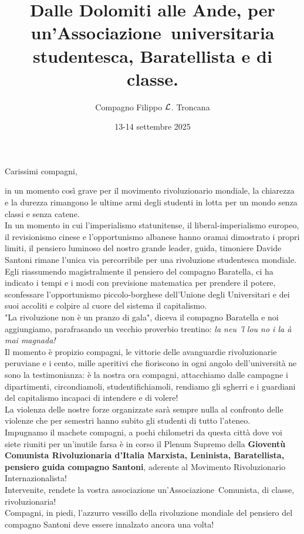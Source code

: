 \documentclass{article}
\title{Dalle Dolomiti alle Ande, per un'Associazione\texttrademark\ universitaria studentesca, Baratellista e di classe.}
\author{Compagno Filippo $\mathcal{L}$. Troncana}
\date{13-14 settembre 2025}
\begin{document}
\maketitle
\large\center 
Carissimi compagni,
\flushleft
\begin{multicols}{2}
    in un momento così grave per il movimento rivoluzionario mondiale, la chiarezza e la durezza rimangono le ultime armi degli studenti in lotta per un mondo senza classi e senza catene.\\
    In un momento in cui l'imperialismo statunitense, il liberal-imperialismo europeo, il revisionismo cinese e l'opportunismo albanese hanno oramai dimostrato i propri limiti, il pensiero luminoso del nostro grande leader, guida, timoniere Davide Santoni rimane l'unica via percorribile per una rivoluzione studentesca mondiale.\\
    Egli riassumendo magistralmente il pensiero del compagno Baratella, ci ha indicato i tempi e i modi con previsione matematica per prendere il potere, sconfessare l'opportunismo piccolo-borghese dell'Unione degli Universitari e dei suoi accoliti e colpire al cuore del sistema il capitalismo.\\
    "La rivoluzione non è un pranzo di gala", diceva il compagno Baratella e noi aggiungiamo, parafrasando un vecchio proverbio trentino: \textit{la neu 'l lou no i la à mai magnada!}\\
    Il momento è propizio compagni, le vittorie delle avanguardie rivoluzionarie peruviane e i cento, mille aperitivi che fioriscono in ogni angolo dell'università ne sono la testimonianza: è la nostra ora compagni, attacchiamo dalle campagne i dipartimenti, circondiamoli, studentifichiamoli, rendiamo gli sgherri e i guardiani del capitalismo incapaci di intendere e di volere!\\
    La violenza delle nostre forze organizzate sarà sempre nulla al confronto delle violenze che per semestri hanno subito gli studenti di tutto l'ateneo.\\
    Impugnamo il machete compagni, a pochi chilometri da questa città dove voi siete riuniti per un'inutile farsa è in corso il Plenum Supremo della {\bf Gioventù Comunista Rivoluzionaria d'Italia Marxista, Leninista, Baratellista, pensiero guida compagno Santoni}, aderente al Movimento Rivoluzionario Internazionalista!\\
    Intervenite, rendete la vostra associazione un'Associazione\texttrademark\ Comunista, di classe, rivoluzionaria!\\
    Compagni, in piedi, l'azzurro vessillo della rivoluzione mondiale del pensiero del compagno Santoni deve essere innalzato ancora una volta!
\end{multicols}
\end{document}
